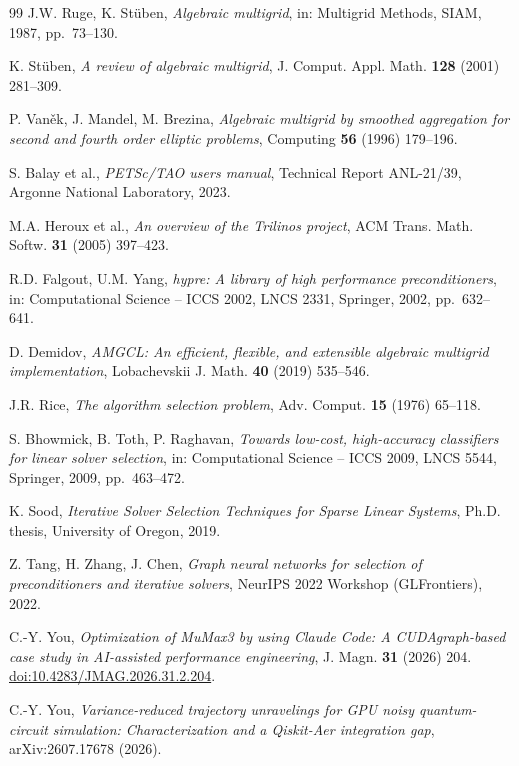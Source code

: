 \documentclass[11pt]{article}
\begin{document}
\begin{thebibliography}{99}
 J.W. Ruge, K. St\"uben, \emph{Algebraic multigrid}, in:
Multigrid Methods, SIAM, 1987, pp.~73--130.

 K. St\"uben, \emph{A review of algebraic multigrid},
J. Comput. Appl. Math. \textbf{128} (2001) 281--309.

 P. Van\v{e}k, J. Mandel, M. Brezina, \emph{Algebraic
multigrid by smoothed aggregation for second and fourth order elliptic
problems}, Computing \textbf{56} (1996) 179--196.

 S. Balay et al., \emph{PETSc/TAO users manual}, Technical
Report ANL-21/39, Argonne National Laboratory, 2023.

 M.A. Heroux et al., \emph{An overview of the Trilinos
project}, ACM Trans. Math. Softw. \textbf{31} (2005) 397--423.

 R.D. Falgout, U.M. Yang, \emph{hypre: A library of high
performance preconditioners}, in: Computational Science -- ICCS 2002, LNCS
2331, Springer, 2002, pp.~632--641.

 D. Demidov, \emph{AMGCL: An efficient, flexible, and extensible
algebraic multigrid implementation}, Lobachevskii J. Math. \textbf{40} (2019)
535--546.

 J.R. Rice, \emph{The algorithm selection problem}, Adv.
Comput. \textbf{15} (1976) 65--118.

 S. Bhowmick, B. Toth, P. Raghavan, \emph{Towards
low-cost, high-accuracy classifiers for linear solver selection}, in:
Computational Science -- ICCS 2009, LNCS 5544, Springer, 2009, pp.~463--472.

 K. Sood, \emph{Iterative Solver Selection Techniques for
Sparse Linear Systems}, Ph.D. thesis, University of Oregon, 2019.

 Z. Tang, H. Zhang, J. Chen, \emph{Graph neural networks for
selection of preconditioners and iterative solvers}, NeurIPS 2022 Workshop
(GLFrontiers), 2022.

 C.-Y. You,
\emph{Optimization of MuMax3 by using Claude Code: A CUDAgraph-based case study
in AI-assisted performance engineering}, J. Magn. \textbf{31} (2026) 204.
\href{https://doi.org/10.4283/JMAG.2026.31.2.204}{doi:10.4283/JMAG.2026.31.2.204}.

 C.-Y. You,
\emph{Variance-reduced trajectory unravelings for GPU noisy quantum-circuit
simulation: Characterization and a Qiskit-Aer integration gap}, arXiv:2607.17678
(2026).


\end{thebibliography}
\end{document}
